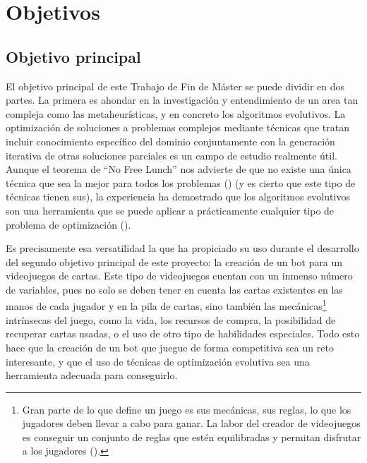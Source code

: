\chapter{Objetivos} \label{chap:objetivos}


\section{Objetivo principal} \label{sec:objetivo_principal}


El objetivo principal de este Trabajo de Fin de Máster se puede dividir en dos partes. La primera es ahondar en la investigación y entendimiento de un area tan compleja como las metaheurísticas, y en concreto los algoritmos evolutivos. La optimización de soluciones a problemas complejos mediante técnicas que tratan incluir conocimiento específico del dominio conjuntamente con la generación iterativa de otras soluciones parciales es un campo de estudio realmente útil. Aunque el teorema de ``No Free Lunch'' nos advierte de que no existe una única técnica que sea la mejor para todos los problemas () (y es cierto que este tipo de técnicas tienen sus), la experiencia ha demostrado que los algoritmos evolutivos son una herramienta que se puede aplicar a prácticamente cualquier tipo de problema de optimización ().

Es precisamente esa versatilidad la que ha propiciado su uso durante el desarrollo del segundo objetivo principal de este proyecto: la creación de un bot para un videojuegos de cartas. Este tipo de videojuegos cuentan con un inmenso número de variables, pues no solo se deben tener en cuenta las cartas existentes en las manos de cada jugador y en la pila de cartas, sino también las mecánicas\footnote{Gran parte de lo que define un juego es sus mecánicas, sus reglas, lo que los jugadores deben llevar a cabo para ganar. La labor del creador de videojuegos es conseguir un conjunto de reglas que estén equilibradas y permitan disfrutar a los jugadores ().} intrínsecas del juego, como la vida, los recursos de compra, la posibilidad de recuperar cartas usadas, o el uso de otro tipo de habilidades especiales. Todo esto hace que la creación de un bot que juegue de forma competitiva sea un reto interesante, y que el uso de técnicas de optimización evolutiva sea una herramienta adecuada para conseguirlo.

